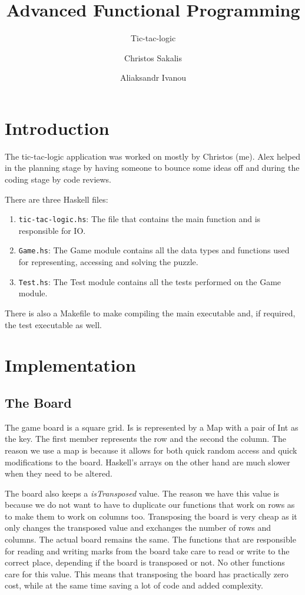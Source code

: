 \documentclass[11pt, a4paper]{scrartcl}
\title{Advanced Functional Programming}
\subtitle{Tic-tac-logic}
\author{Christos Sakalis \\ \email{Christos.Sakalis.3822@student.uu.se}
    \and Aliaksandr Ivanou \\ \email{Aliaksandr.Ivanou.1364@student.uu.se}}
\newcommand{\cname}[1]{\mbox{\texttt{#1}}}
\begin{document}
\maketitle

\section{Introduction}

The tic-tac-logic application was worked on mostly by Christos (me). Alex helped
in the planning stage by having someone to bounce some ideas off and during the
coding stage by code reviews.

There are three Haskell files:

\begin{enumerate}
    \item \cname{tic-tac-logic.hs}: The file that contains the main function and
        is responsible for IO.
    \item \cname{Game.hs}: The Game module contains all the data types and
        functions used for representing, accessing and solving the puzzle.
    \item \cname{Test.hs}: The Test module contains all the tests performed on
        the Game module.
\end{enumerate}

There is also a Makefile to make compiling the main executable and, if required,
the test executable as well.

\section{Implementation}

\subsection{The Board}

The game board is a square grid. Is is represented by a Map with a pair of Int
as the key. The first member represents the row and the second the column. The
reason we use a map is because it allows for both quick random access and quick
modifications to the board. Haskell's arrays on the other hand are much slower
when they need to be altered.

The board also keeps a \emph{isTransposed} value. The reason we have this value is
because we do not want to have to duplicate our functions that work on rows as
to make them to work on columns too. Transposing the board is very cheap as it
only changes the transposed value and exchanges the number of rows and columns.
The actual board remains the same. The functions that are responsible for
reading and writing marks from the board take care to read or write to the
correct place, depending if the board is transposed or not. No other functions
care for this value. This means that transposing the board has practically zero
cost, while at the same time saving a lot of code and added complexity.
\end{document}
